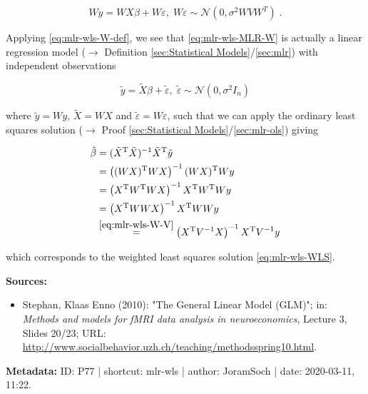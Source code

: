 \documentclass[a4paper,12pt,twoside]{book}
\begin{document}
\begin{equation} \label{eq:mlr-wls-MLR-W}
Wy = WX\beta + W\varepsilon, \; W\varepsilon \sim \mathcal{N}(0, \sigma^2 W V W^T) \; .
\end{equation}

Applying \eqref{eq:mlr-wls-W-def}, we see that \eqref{eq:mlr-wls-MLR-W} is actually a linear regression model ($\rightarrow$ Definition \ref{sec:Statistical Models}/\ref{sec:mlr}) with independent observations

\begin{equation} \label{eq:mlr-wls-MLR-W-dev}
\tilde{y} = \tilde{X}\beta + \tilde{\varepsilon}, \; \tilde{\varepsilon} \sim \mathcal{N}(0, \sigma^2 I_n)
\end{equation}

where $\tilde{y} = Wy$, $\tilde{X} = WX$ and $\tilde{\varepsilon} = W\varepsilon$, such that we can apply the ordinary least squares solution ($\rightarrow$ Proof \ref{sec:Statistical Models}/\ref{sec:mlr-ols}) giving

\begin{equation} \label{eq:mlr-wls-WLS-qed}
\begin{split}
\hat{\beta} &= (\tilde{X}^\mathrm{T} \tilde{X})^{-1} \tilde{X}^\mathrm{T} \tilde{y} \\
&= \left( (WX)^\mathrm{T} WX \right)^{-1} (WX)^\mathrm{T} Wy \\
&= \left( X^\mathrm{T} W^\mathrm{T} W X \right)^{-1} X^\mathrm{T} W^\mathrm{T} W y \\
&= \left( X^\mathrm{T} W W X \right)^{-1} X^\mathrm{T} W W y \\
&\overset{\eqref{eq:mlr-wls-W-V}}{=} \left( X^\mathrm{T} V^{-1} X \right)^{-1} X^\mathrm{T} V^{-1} y
\end{split}
\end{equation}

which corresponds to the weighted least squares solution \eqref{eq:mlr-wls-WLS}.


\vspace{1em}
\textbf{Sources:}
\begin{itemize}
\item Stephan, Klaas Enno (2010): "The General Linear Model (GLM)"; in: \textit{Methods and models for fMRI data analysis in neuroeconomics}, Lecture 3, Slides 20/23; URL: \url{http://www.socialbehavior.uzh.ch/teaching/methodsspring10.html}.
\end{itemize}


\vspace{1em}
\textbf{Metadata:} ID: P77 | shortcut: mlr-wls | author: JoramSoch | date: 2020-03-11, 11:22.
\vspace{1em}
\end{document}
